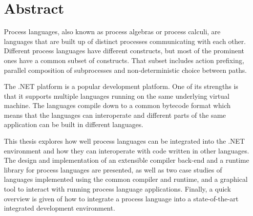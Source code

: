 \chapter{Abstract}

	Process languages, also known as process algebras or process calculi, are 
	languages that are built up of distinct processes communicating with each 
	other. Different process languages have different constructs, but most of 
	the prominent ones have a common subset of constructs. That subset includes 
	action prefixing, parallel composition of subprocesses and non-deterministic 
	choice between paths.

	The .NET platform is a popular development platform. One of its strengths is
	that it supports multiple languages running on the same underlying virtual 
	machine. The languages compile down to a common bytecode format which means 
	that the languages can interoperate and different parts of the same 
	application can be built in different languages.

	This thesis explores how well process languages can be integrated into the 
	.NET environment and how they can interoperate with code written in other 
	languages.  The design and implementation of an extensible compiler back-end 
	and a runtime library for process languages are presented, as well as two 
	case studies of languages implemented using the common compiler and runtime,
	and a graphical tool to interact with running process language applications. 
	Finally, a quick overview is given of how to integrate a process language 
	into a state-of-the-art integrated development environment.